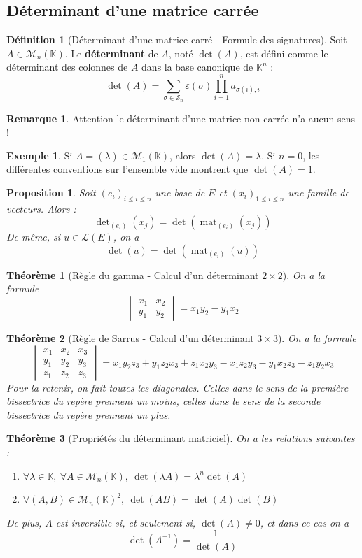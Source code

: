 \documentclass[french]{book}
\newcommand{\K}{\mathbb{K}}
\newcommand{\inv}{^{-1}}
\theoremstyle{plain}
\newtheorem{thm}{Théorème}[chapter]
\newtheorem{prop}{Proposition}[chapter]
\theoremstyle{definition}
\newtheorem{dfn}{Définition}[chapter]
\newtheorem{exa}{Exemple}[chapter]
\newtheorem{rmq}{Remarque}[chapter]
\theoremstyle{remark}
\DeclareMathOperator{\mat}{mat}
\begin{document}
\subsection{Déterminant d'une matrice carrée}
\begin{dfn}[Déterminant d'une matrice carré - Formule des signatures]
	Soit $A\in\mathcal{M}_n(\K)$. Le \textbf{déterminant} de $A$, noté $\det(A)$, est défini comme le déterminant des colonnes de $A$ dans la base canonique de $\K^n$ : $$\det(A)=\sum_{\sigma\in\mathcal{S}_n}\varepsilon(\sigma)\prod_{i=1}^{n}a_{\sigma(i),i}$$
\end{dfn}
\begin{rmq} Attention le déterminant d'une matrice non carrée n'a aucun sens ! \end{rmq}
\begin{exa}
	Si $A=(\lambda)\in\mathcal{M}_1(\K)$, alors $\det(A)=\lambda$. Si $n=0$, les différentes conventions sur l'ensemble vide montrent que $\det(A)=1$.
\end{exa}
\begin{prop}
	Soit $(e_i)_{i\leqslant i\leqslant n}$ une base de $E$ et $(x_i)_{1\leqslant i\leqslant n}$ une famille de vecteurs. Alors :
	$$\det\nolimits_{(e_i)}(x_j)=\det(\mat_{(e_i)}(x_j))$$ De même, si $u\in\mathcal{L}(E)$, on a $$\det(u)=\det(\mat_{(e_i)}(u))$$
\end{prop}
\begin{thm}[Règle du gamma - Calcul d'un déterminant $2\times2$]
	On a la formule $$\begin{vmatrix}x_1&x_2\\y_1&y_2\end{vmatrix}=x_1y_2-y_1x_2$$
\end{thm}
\begin{thm}[Règle de Sarrus - Calcul d'un déterminant $3\times3$]
	On a la formule $$\begin{vmatrix}x_1&x_2&x_3\\y_1&y_2&y_3\\z_1&z_2&z_3\end{vmatrix}=x_1y_2z_3+y_1z_2x_3+z_1x_2y_3-x_1z_2y_3-y_1x_2z_3-z_1y_2x_3$$ Pour la retenir, on fait toutes les diagonales. Celles dans le sens de la première bissectrice du repère prennent un moins, celles dans le sens de la seconde bissectrice du repère prennent un plus.
\end{thm}
\begin{thm}[Propriétés du déterminant matriciel]
	On a les relations suivantes :
	\begin{enumerate}
		\item $\forall\lambda\in\K,\ \forall A\in\mathcal{M}_n(\K),\ \det(\lambda A)=\lambda^n\det(A)$
		\item $\forall(A,B)\in\mathcal{M}_n(\K)^2,\ \det(AB)=\det(A)\det(B)$
	\end{enumerate}
	De plus, $A$ est inversible si, et seulement si, $\det(A)\ne 0$, et dans ce cas on a $$\det(A\inv)=\frac{1}{\det(A)}$$
\end{thm}
\end{document}
